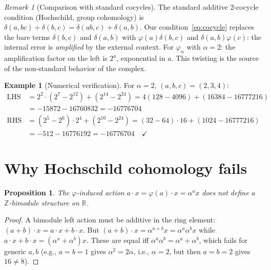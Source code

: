 \documentclass[11pt,a4paper]{article}
\theoremstyle{plain}
\newtheorem{proposition}[theorem]{Proposition}
\theoremstyle{definition}
\newtheorem{example}[theorem]{Example}
\theoremstyle{remark}
\newtheorem{remark}[theorem]{Remark}
\newcommand{\ZZ}{\mathbb{Z}}
\newcommand{\RR}{\mathbb{R}}
\begin{document}
\begin{remark}[Comparison with standard cocycles]
\label{rem:standard-vs-twisted}
The standard additive 2-cocycle condition (Hochschild, group cohomology) 
is $\delta(a,bc) + \delta(b,c) = \delta(ab,c) + \delta(a,b)$. Our 
condition~\eqref{eq:cocycle} replaces the bare terms $\delta(b,c)$ and 
$\delta(a,b)$ with $\varphi(a)\delta(b,c)$ and $\delta(a,b)\varphi(c)$: 
the internal error is \textit{amplified} by the external context. For 
$\varphi_\alpha$ with $\alpha = 2$: the amplification factor on the 
left is $2^a$, exponential in $a$. This twisting is the source of the 
non-standard behavior of the complex.
\end{remark}

\begin{example}[Numerical verification]
\label{ex:numerical-cocycle}
For $\alpha = 2$, $(a,b,c) = (2, 3, 4)$:
\begin{align*}
\text{LHS} &= 2^2 \cdot (2^7 - 2^{12}) + (2^{14} - 2^{24}) 
= 4(128 - 4096) + (16384 - 16777216) \\
&= -15872 - 16760832 = -16776704 \\
\text{RHS} &= (2^5 - 2^6) \cdot 2^4 + (2^{10} - 2^{24}) 
= (32 - 64) \cdot 16 + (1024 - 16777216) \\
&= -512 - 16776192 = -16776704 \quad\checkmark
\end{align*}
\end{example}

\section{Why Hochschild cohomology fails}
\label{sec:not-hochschild}

\begin{proposition}
\label{prop:not-bimodule}
The $\varphi$-induced action $a \cdot x = \varphi(a) \cdot x = 
\alpha^a x$ does not define a $\ZZ$-bimodule structure on $\RR$.
\end{proposition}

\begin{proof}
A bimodule left action must be additive in the ring element: 
$(a + b) \cdot x = a \cdot x + b \cdot x$. But $(a + b) \cdot x = 
\alpha^{a+b} x = \alpha^a \alpha^b x$ while $a \cdot x + b \cdot x = 
(\alpha^a + \alpha^b)x$. These are equal iff $\alpha^a \alpha^b = 
\alpha^a + \alpha^b$, which fails for generic $a, b$ (e.g., $a = b = 1$ 
gives $\alpha^2 = 2\alpha$, i.e., $\alpha = 2$, but then $a = b = 2$ 
gives $16 \neq 8$).
\end{proof}
\end{document}
